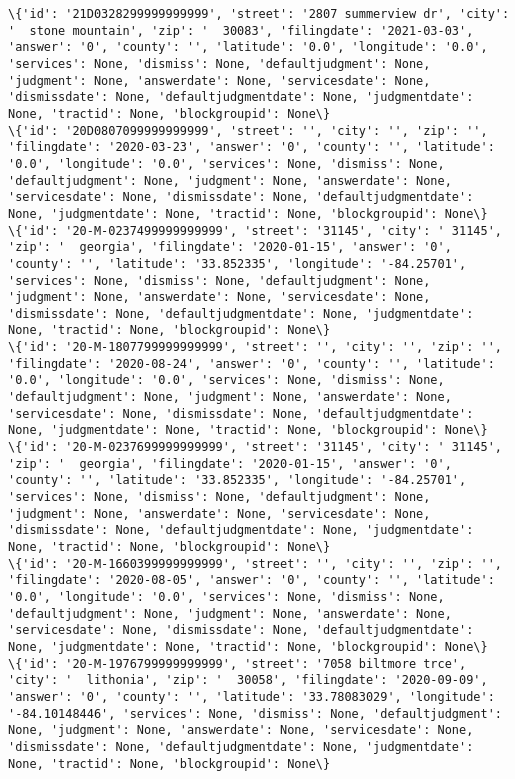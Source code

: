 \documentclass[11pt]{article}
\begin{document}
\begin{Verbatim}[commandchars=\\\{\}]
\{'id': '21D0328299999999999', 'street': '2807 summerview dr', 'city': '  stone mountain', 'zip': '  30083', 'filingdate': '2021-03-03', 'answer': '0', 'county': '', 'latitude': '0.0', 'longitude': '0.0', 'services': None, 'dismiss': None, 'defaultjudgment': None, 'judgment': None, 'answerdate': None, 'servicesdate': None, 'dismissdate': None, 'defaultjudgmentdate': None, 'judgmentdate': None, 'tractid': None, 'blockgroupid': None\}
\{'id': '20D0807099999999999', 'street': '', 'city': '', 'zip': '', 'filingdate': '2020-03-23', 'answer': '0', 'county': '', 'latitude': '0.0', 'longitude': '0.0', 'services': None, 'dismiss': None, 'defaultjudgment': None, 'judgment': None, 'answerdate': None, 'servicesdate': None, 'dismissdate': None, 'defaultjudgmentdate': None, 'judgmentdate': None, 'tractid': None, 'blockgroupid': None\}
\{'id': '20-M-0237499999999999', 'street': '31145', 'city': ' 31145', 'zip': '  georgia', 'filingdate': '2020-01-15', 'answer': '0', 'county': '', 'latitude': '33.852335', 'longitude': '-84.25701', 'services': None, 'dismiss': None, 'defaultjudgment': None, 'judgment': None, 'answerdate': None, 'servicesdate': None, 'dismissdate': None, 'defaultjudgmentdate': None, 'judgmentdate': None, 'tractid': None, 'blockgroupid': None\}
\{'id': '20-M-1807799999999999', 'street': '', 'city': '', 'zip': '', 'filingdate': '2020-08-24', 'answer': '0', 'county': '', 'latitude': '0.0', 'longitude': '0.0', 'services': None, 'dismiss': None, 'defaultjudgment': None, 'judgment': None, 'answerdate': None, 'servicesdate': None, 'dismissdate': None, 'defaultjudgmentdate': None, 'judgmentdate': None, 'tractid': None, 'blockgroupid': None\}
\{'id': '20-M-0237699999999999', 'street': '31145', 'city': ' 31145', 'zip': '  georgia', 'filingdate': '2020-01-15', 'answer': '0', 'county': '', 'latitude': '33.852335', 'longitude': '-84.25701', 'services': None, 'dismiss': None, 'defaultjudgment': None, 'judgment': None, 'answerdate': None, 'servicesdate': None, 'dismissdate': None, 'defaultjudgmentdate': None, 'judgmentdate': None, 'tractid': None, 'blockgroupid': None\}
\{'id': '20-M-1660399999999999', 'street': '', 'city': '', 'zip': '', 'filingdate': '2020-08-05', 'answer': '0', 'county': '', 'latitude': '0.0', 'longitude': '0.0', 'services': None, 'dismiss': None, 'defaultjudgment': None, 'judgment': None, 'answerdate': None, 'servicesdate': None, 'dismissdate': None, 'defaultjudgmentdate': None, 'judgmentdate': None, 'tractid': None, 'blockgroupid': None\}
\{'id': '20-M-1976799999999999', 'street': '7058 biltmore trce', 'city': '  lithonia', 'zip': '  30058', 'filingdate': '2020-09-09', 'answer': '0', 'county': '', 'latitude': '33.78083029', 'longitude': '-84.10148446', 'services': None, 'dismiss': None, 'defaultjudgment': None, 'judgment': None, 'answerdate': None, 'servicesdate': None, 'dismissdate': None, 'defaultjudgmentdate': None, 'judgmentdate': None, 'tractid': None, 'blockgroupid': None\}

    \end{Verbatim}
\end{document}
